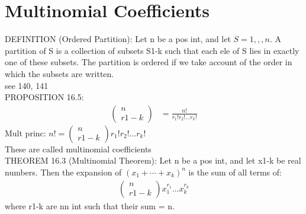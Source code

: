 \documentclass[12pt]{article}
\begin{document}
\section{Multinomial Coefficients}
	DEFINITION (Ordered Partition): Let n be a pos int, and let
	$ S = {1,,,n} $. A partition of S is a collection of subsets
	S1-k such that each ele of S lies in exactly one of these subsets.
	The partition is ordered if we take account of the order in which the
	subsets are written. \\
	see 140, 141 \\
	PROPOSITION 16.5:
	\begin{align*}
			\begin{pmatrix} n \\ r1-k \end{pmatrix} &= 
			\frac{n!}{r_1!r_2!...r_k!} 
	\end{align*}
	Mult princ: $ n! = 	\begin{pmatrix} n \\ r1-k \end{pmatrix} r_1!r_2!...r_k! $\\
	These are called multinomial coefficients \\
	THEOREM 16.3 (Multinomial Theorem): Let n be a pos int, and let
	x1-k be real numbers. Then the expansion of
	$ (x_1 + \cdots + x_k)^n $ is the sum of all terms of:
	\begin{align*}
			\begin{pmatrix} n \\ r1-k \end{pmatrix} x_1^{r_1}...x_k^{r_k}
	\end{align*}
	where r1-k are nn int such that their sum = n.
\end{document}

